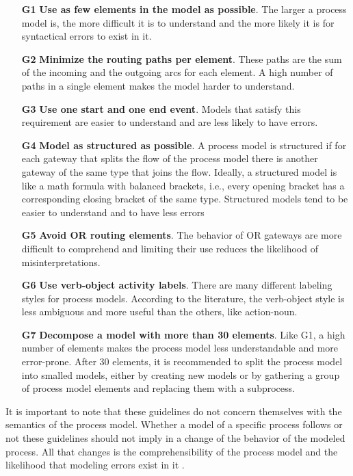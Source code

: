 \documentclass[a4paper,twoside]{article}
\begin{document}
\begin{enumerate}
	\item[\textbf{G1}] \textbf{Use as few elements in the model as possible}. The larger a process model is, the more difficult it is to understand and the more likely it is for syntactical errors to exist in it.
	\item[\textbf{G2}] \textbf{Minimize the routing paths per element}. These paths are the sum of the incoming and the outgoing arcs for each element. A high number of paths in a single element makes the model harder to understand.
	\item[\textbf{G3}] \textbf{Use one start and one end event}. Models that satisfy this requirement are easier to understand and are less likely to have errors.
	\item[\textbf{G4}] \textbf{Model as structured as possible}. A process model is structured if for each gateway that splits the flow of the process model there is another gateway of the same type that joins the flow. Ideally, a structured model is like a math formula with balanced brackets, i.e., every opening bracket has a corresponding closing bracket of the same type. Structured models tend to be easier to understand and to have less errors
	\item[\textbf{G5}] \textbf{Avoid OR routing elements}. The behavior of OR gateways are more difficult to comprehend and limiting their use reduces the likelihood of misinterpretations.
	\item[\textbf{G6}] \textbf{Use verb-object activity labels}. There are many different labeling styles for process models. According to the literature, the verb-object style is less ambiguous and more useful than the others, like action-noun.
	\item[\textbf{G7}] \textbf{Decompose a model with more than 30 elements}. Like G1, a high number of elements makes the process model less understandable and more error-prone. After 30 elements, it is recommended to split the process model into smalled models, either by creating new models or by gathering a group of process model elements and replacing them with a subprocess.
\end{enumerate}

It is important to note that these guidelines do not concern themselves with the semantics of the process model. Whether a model of a specific process follows or not these guidelines should not imply in a change of the behavior of the modeled process. All that changes is the comprehensibility of the process model and the likelihood that modeling errors exist in it  \citep{Mendling2010}.
\end{document}
